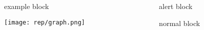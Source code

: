 \documentclass{beamer}
\begin{document}
        
    \begin{frame}
    \frametitle{}
    \framesubtitle{}

        \begin{columns}[c] %
        
            \begin{column}{5.5cm} %
                \begin{exampleblock}{example block}
                \end{exampleblock}
                \texttt{[image: rep/graph.png]}
            \end{column}
            
            \begin{column}{5.5cm} %
                \begin{alertblock}{alert block}
                \end{alertblock}
                \vspace{1cm} %
                \begin{block}{normal block}
                \end{block}
            \end{column}

        \end{columns}

    \end{frame}
\end{document}
